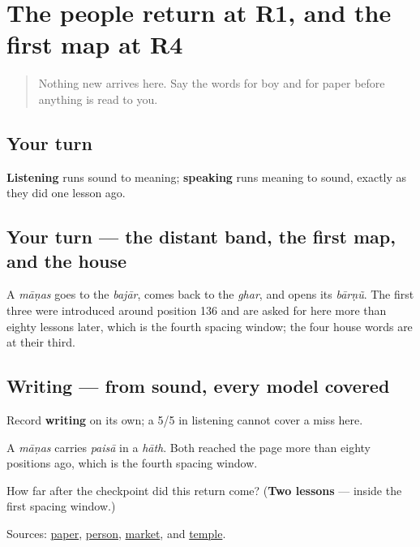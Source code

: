 \section[Practice]{The people return at R1, and the first map at R4}

\label{lesson:GU-R30-people-five-r1}



\begin{quote}
Nothing new arrives here. Say the words for boy and for paper before anything is read to you.
\end{quote}

\subsection*{Your turn}
\textbf{Listening} runs sound to meaning; \textbf{speaking} runs meaning to sound, exactly as they did one lesson ago.

\subsection*{Your turn — the distant band, the first map, and the house}
A \emph{māṇas} goes to the \emph{bajār}, comes back to the \emph{ghar}, and opens its \emph{bārṇũ}. The first three were introduced around position 136 and are asked for here more than eighty lessons later, which is the fourth spacing window; the four house words are at their third.

\subsection*{Writing — from sound, every model covered}
Record \textbf{writing} on its own; a 5/5 in listening cannot cover a miss here.

A \emph{māṇas} carries \emph{paisā} in a \emph{hāth}. Both reached the page more than eighty positions ago, which is the fourth spacing window.

\begin{tcolorbox}[breakable,colback=teal!4,colframe=teal!35!black,title={Before you move on}]
How far after the checkpoint did this return come? (\textbf{Two lessons} — inside the first spacing window.)

Sources: \href{https://dictionary.cambridge.org/dictionary/english-gujarati/paper}{paper}, \href{https://dictionary.cambridge.org/dictionary/english-gujarati/person}{person}, \href{https://dictionary.cambridge.org/dictionary/english-gujarati/market}{market}, and \href{https://dictionary.cambridge.org/dictionary/english-gujarati/temple}{temple}.
\end{tcolorbox}
